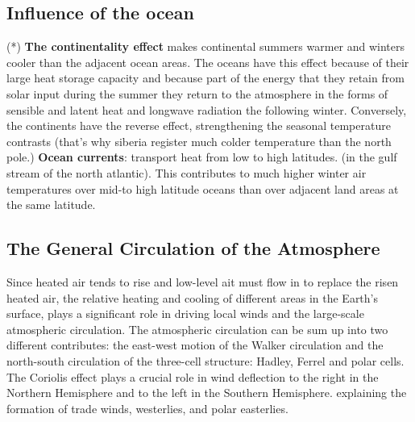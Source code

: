 \subsection{Influence of the ocean}(*) \textbf{The continentality effect} makes continental summers warmer and winters cooler than the adjacent ocean areas. The oceans have this effect because of their large heat storage capacity and because part of  the energy that they retain from solar input during the summer they return to the atmosphere in the forms of sensible and latent heat and longwave radiation the following winter. Conversely, the continents have the reverse effect, strengthening the seasonal temperature contrasts (that’s why siberia register much colder temperature than the north pole.)
\newline \textbf{Ocean currents}: transport heat from low to high latitudes. (in the gulf stream of the north atlantic). This contributes to much higher winter air temperatures over mid-to high latitude oceans than over adjacent land areas at the same latitude.





\subsection{The General Circulation of the Atmosphere}\label{chp:GeneralCirculation}

Since heated air tends to rise and low-level ait must flow in to replace the risen heated air, the relative heating and cooling of different areas in the Earth’s surface, plays a significant role in driving local winds and the large-scale atmospheric circulation.
The atmospheric circulation can be sum up into two different contributes: the east-west motion of the Walker circulation and the north-south circulation of the
three-cell structure: Hadley, Ferrel and polar cells. The Coriolis effect plays a crucial role in wind deflection to the right in the Northern Hemisphere and to the left in the Southern Hemisphere. explaining the formation of trade winds, westerlies, and polar easterlies.

